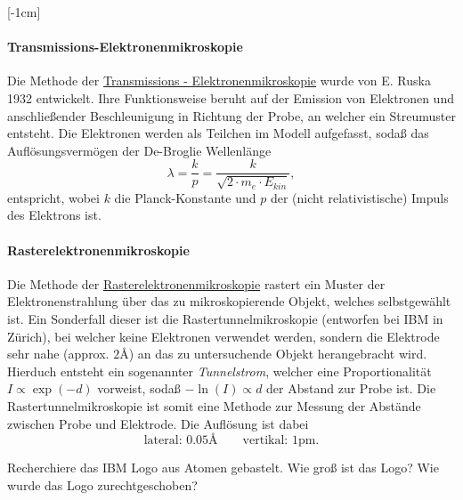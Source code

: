 \documentclass{subfiles}
\begin{document}
    [-1cm]
        \paragraph*{Transmissions-Elektronenmikroskopie}\label{Ub:Transmissionselektronenmikroskop}\marginnote{$\to$ \hyperref[Ub:AtomEigenschaften]{\faBook}}
            Die Methode der \href{https://de.wikipedia.org/wiki/Transmissionselektronenmikroskop}{Transmissions - Elektronenmikroskopie} wurde von E. Ruska 1932 entwickelt. Ihre Funktionsweise beruht auf der Emission von Elektronen und anschließender Beschleunigung in Richtung der Probe, an welcher ein Streumuster entsteht. Die Elektronen werden als Teilchen im Modell aufgefasst, sodaß das Auflösungsvermögen der De-Broglie Wellenlänge 
            \[\lambda = \frac{k}{p} = \frac{k}{\sqrt{2\cdot m_e\cdot E_\textit{kin}}},\]
            entspricht, wobei $k$ die Planck-Konstante und $p$ der (nicht relativistische) Impuls des Elektrons ist.

        \paragraph*{Rasterelektronenmikroskopie}\label{Ub:Rasterelektronenmikroskop}\marginnote{$\to$ \hyperref[Ub:AtomEigenschaften]{\faBook}}
            Die Methode der \href{https://de.wikipedia.org/wiki/Rasterelektronenmikroskopie}{Rasterelektronenmikroskopie} rastert ein Muster der Elektronenstrahlung über das zu mikroskopierende Objekt, welches selbstgewählt ist. Ein Sonderfall dieser ist die Rastertunnelmikroskopie (entworfen bei IBM in Zürich), bei welcher keine Elektronen verwendet werden, sondern die Elektrode sehr nahe (approx. $2\si\angstrom$) an das zu untersuchende Objekt herangebracht wird. Hierduch entsteht ein sogenannter \emph{Tunnelstrom}, welcher eine Proportionalität $I\propto \exp(-d)$ vorweist, sodaß $-\ln(I)\propto d$ der Abstand zur Probe ist. Die Rastertunnelmikroskopie ist somit eine Methode zur Messung der Abstände zwischen Probe und Elektrode. Die Auflösung ist dabei 
            \[\text{lateral: }0.05\si\angstrom \qquad\text{vertikal: }1\si{\pico\metre}.\]
            \begin{Aufgabe}
                \nr{} Recherchiere das IBM Logo aus Atomen gebastelt. Wie groß ist das Logo? Wie wurde das Logo zurechtgeschoben?
            \end{Aufgabe}
        
\end{document}

